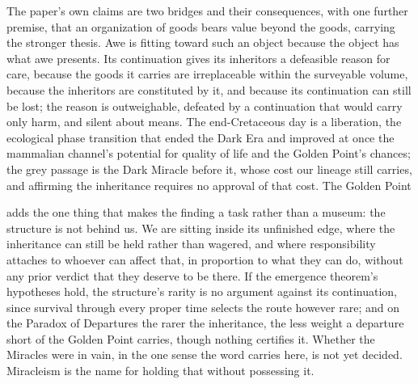The paper's own claims are two bridges and their consequences, with one
further premise, that an organization of goods bears value beyond the goods,
carrying the stronger thesis. Awe is fitting
toward such an object because the object has what awe presents. Its
continuation gives its inheritors a defeasible reason for care, because the
goods it carries are irreplaceable within the surveyable volume, because the
inheritors are constituted by it, and because its continuation can still be
lost; the reason is outweighable, defeated by a continuation that would carry
only harm, and silent about means. The end-Cretaceous day is a liberation,
the ecological phase transition that ended the Dark Era and improved at once
the mammalian channel's potential for quality of life and the Golden Point's
chances;
the grey passage is the Dark Miracle before it, whose cost our lineage still
carries, and affirming the inheritance requires no approval of that cost. The
Golden Point

adds the one thing that makes the finding a task rather than a museum: the
structure is not behind us. We are sitting inside its unfinished edge, where
the inheritance can still be held rather than wagered, and where
responsibility attaches to whoever can affect that, in proportion to what they
can do, without any prior verdict that they deserve to be there. If the emergence
theorem's hypotheses hold, the structure's rarity is no argument against its
continuation, since survival through every proper time selects the route
however rare; and on the Paradox of Departures the rarer the
inheritance, the less weight a departure short of the Golden Point carries,
though nothing certifies it. Whether the
Miracles were in vain, in the one sense the word carries here, is not yet
decided. Miracleism is the name for holding that without possessing it.

